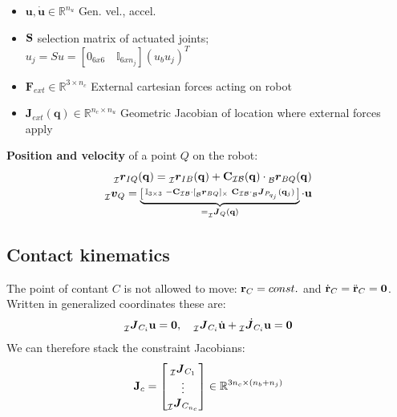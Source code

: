 \documentclass[a4paper, 8pt]{extarticle}
\newcommand{\mvec}[3]{  \prescript{}{\mathcal{#1}}{\bm{#2}}  _{#3} }
\newcommand{\mdvec}[3]{ \prescript{}{\mathcal{#1}}{\dot{\bm #2}} _{#3} }
\newcommand{\mrot}[2]{ \textbf{#1}_{ \mathcal{#2} } }
\begin{document}
\begin{multicols*}{3}
\begin{itemize}
\item $\mathbf{u,\dot u} \in \mathbb{R}^{n_u}$ Gen. vel., accel.
\item $\bf S$ selection matrix of actuated joints;\\ $u_{j}=Su=[0_{6x6} \quad \mathbb{I}_{6xn_{j}}](u_{b} u_{j})^T$
\item $\mathbf{F}_{ext} \in \mathbb{R}^{3\times n_c}$ External cartesian forces acting on robot
\item $\mathbf J_{ext}(\mathbf q) \in \mathbb R^{n_c\times n_u}$ Geometric Jacobian of location where external forces apply
\end{itemize}
\noindent \textbf{Position and velocity} of a point $Q$ on the robot: 
\begin{align*}
\mvec{I}{r}{IQ}({\bf q}) = \mvec{I}{r}{IB}({\bf q}) + \mrot{C}{IB}({\bf q}) \cdot \mvec{B}{r}{BQ}({\bf q})\\
\mvec{I}{v}{Q} = \underbrace{\left[\begin{smallmatrix} \mathbb{I}_{3\times 3} & -\mrot{C}{IB} \cdot [\mvec{B}{r}{BQ}]_{\times} & \mrot{C}{IB} \cdot \mvec{B}{J}{P_{q_j}}({\bf q}_j) \end{smallmatrix}\right]}_{ = \mvec{I}{J}{Q}({\bf q})}\cdot {\bf u}
\end{align*}


\subsection{Contact kinematics}
The point of contant $C$ is not allowed to move: ${\bf r}_C = const.$ and $\dot{\bf r}_C = \ddot{\bf r}_C = \bm 0$. Written in generalized coordinates these are:
$$\mvec{I}{J}{C_i}{\bf u} = \bm 0, \quad \mvec{I}{J}{C_i}\dot{\bf u} + \mdvec{I}{J}{C_i}{\bf u} = \bm 0$$
We can therefore stack the constraint Jacobians:
$${\bf J}_c = \begin{bmatrix}
\mvec{I}{J}{C_1} \\
\vdots \\
\mvec{I}{J}{C_{n_c}}
\end{bmatrix}
\in \mathbb{R}^{3n_c \times (n_b + n_j)}
$$


\end{multicols*}
\end{document}
